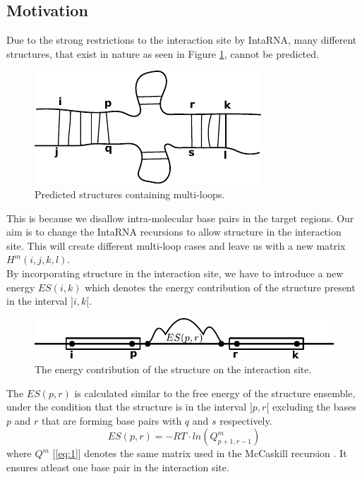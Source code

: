 \documentclass[11pt,a4paper]{report}
\begin{document}
\subsection*{Motivation}
Due to the strong restrictions to the interaction site by IntaRNA, many different structures, that exist in nature as seen in Figure \ref{nowPos}, cannot be predicted.
\begin{figure}[H]
\centering
\includegraphics[scale=1.25]{PossibleStructs.pdf}
\caption{Predicted structures containing multi-loops.}
\label{nowPos}
\end{figure}
\noindent
This is because we disallow intra-molecular base pairs in the target regions. Our aim is to change the IntaRNA recursions to allow structure in the interaction site.
This will create different multi-loop cases and leave us with a new matrix $H^m(i,j,k,l)$.\\
By incorporating structure in the interaction site, we have to introduce a new energy $ES(i,k)$ which denotes the energy contribution of the structure present in the interval $]i,k[$.\\
\begin{figure}[H]
\centering
\captionsetup{justification=centering,margin=2cm}
\includegraphics[scale=0.75]{EStructure.pdf}
\caption{The energy contribution of the structure on the interaction site.}
\end{figure}
\noindent
The $ES(p,r)$ is calculated similar to the free energy of the structure ensemble, under the condition that the structure is in the interval $]p,r[$ excluding the bases $p$ and $r$ that are forming base pairs with $q$ and $s$ respectively.\\ 
\begin{equation*}
ES(p,r) = -RT \cdot ln(Q_{p+1,r-1}^{m})
\end{equation*}
where $Q^m$ [\ref{eq:1}] denotes the same matrix used in the McCaskill recursion \citep{McCaskill}. It ensures atleast one base pair in the interaction site.\\
\end{document}
